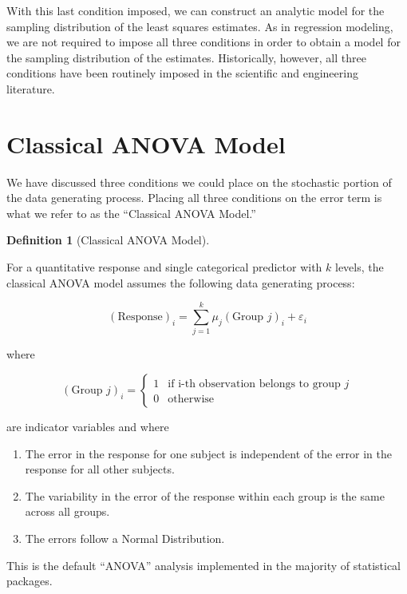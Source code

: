 \documentclass[
  letterpaper,
  DIV=11,
  numbers=noendperiod]{scrreprt}
\providecommand{\tightlist}{%
  \setlength{\itemsep}{0pt}\setlength{\parskip}{0pt}}\usepackage{longtable,booktabs,array}
\theoremstyle{plain}
\theoremstyle{definition}
\theoremstyle{definition}
\newtheorem{definition}{Definition}[chapter]
\theoremstyle{remark}
\begin{document}
With this last condition imposed, we can construct an analytic model for
the sampling distribution of the least squares estimates. As in
regression modeling, we are not required to impose all three conditions
in order to obtain a model for the sampling distribution of the
estimates. Historically, however, all three conditions have been
routinely imposed in the scientific and engineering literature.

\section{Classical ANOVA Model}\label{classical-anova-model}

We have discussed three conditions we could place on the stochastic
portion of the data generating process. Placing all three conditions on
the error term is what we refer to as the ``Classical ANOVA Model.''

\begin{definition}[Classical ANOVA
Model]\protect\hypertarget{def-classical-anova}{}\label{def-classical-anova}

For a quantitative response and single categorical predictor with \(k\)
levels, the classical ANOVA model assumes the following data generating
process:

\[(\text{Response})_i = \sum_{j=1}^{k} \mu_j (\text{Group } j)_i + \varepsilon_i\]

where

\[
(\text{Group } j)_{i} = \begin{cases}
  1 & \text{if i-th observation belongs to group } j \\
  0 & \text{otherwise}
  \end{cases}
\]

are indicator variables and where

\begin{enumerate}
\def\labelenumi{\arabic{enumi}.}
\tightlist
\item
  The error in the response for one subject is independent of the error
  in the response for all other subjects.
\item
  The variability in the error of the response within each group is the
  same across all groups.
\item
  The errors follow a Normal Distribution.
\end{enumerate}

This is the default ``ANOVA'' analysis implemented in the majority of
statistical packages.

\end{definition}
\end{document}

